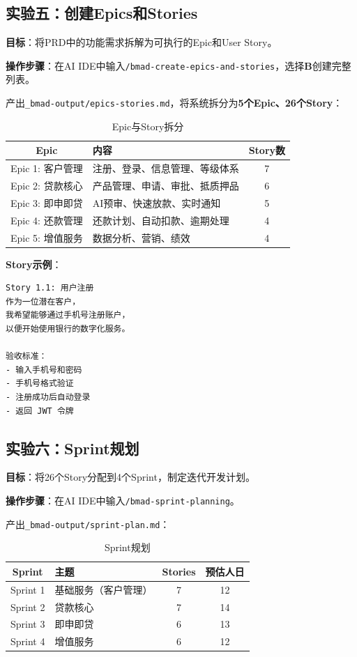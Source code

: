 \subsection{实验五：创建Epics和Stories}

\textbf{目标}：将PRD中的功能需求拆解为可执行的Epic和User Story。

\textbf{操作步骤}：在AI IDE中输入\texttt{/bmad-create-epics-and-stories}，选择\textbf{B}创建完整列表。

产出\texttt{\_bmad-output/epics-stories.md}，将系统拆分为\textbf{5个Epic、26个Story}：

\begin{table}[H]
\centering
\begin{tabular}{clc}
\toprule
\textbf{Epic} & \textbf{内容} & \textbf{Story数} \\
\midrule
Epic 1: 客户管理 & 注册、登录、信息管理、等级体系 & 7 \\
Epic 2: 贷款核心 & 产品管理、申请、审批、抵质押品 & 6 \\
Epic 3: 即申即贷 & AI预审、快速放款、实时通知 & 5 \\
Epic 4: 还款管理 & 还款计划、自动扣款、逾期处理 & 4 \\
Epic 5: 增值服务 & 数据分析、营销、绩效 & 4 \\
\bottomrule
\end{tabular}
\caption{Epic与Story拆分}
\end{table}

\textbf{Story示例}：

\begin{lstlisting}
Story 1.1: 用户注册
作为一位潜在客户，
我希望能够通过手机号注册账户，
以便开始使用银行的数字化服务。

验收标准：
- 输入手机号和密码
- 手机号格式验证
- 注册成功后自动登录
- 返回 JWT 令牌
\end{lstlisting}

\subsection{实验六：Sprint规划}

\textbf{目标}：将26个Story分配到4个Sprint，制定迭代开发计划。

\textbf{操作步骤}：在AI IDE中输入\texttt{/bmad-sprint-planning}。

产出\texttt{\_bmad-output/sprint-plan.md}：

\begin{table}[H]
\centering
\begin{tabular}{clcc}
\toprule
\textbf{Sprint} & \textbf{主题} & \textbf{Stories} & \textbf{预估人日} \\
\midrule
Sprint 1 & 基础服务（客户管理） & 7 & 12 \\
Sprint 2 & 贷款核心 & 7 & 14 \\
Sprint 3 & 即申即贷 & 6 & 13 \\
Sprint 4 & 增值服务 & 6 & 12 \\
\bottomrule
\end{tabular}
\caption{Sprint规划}
\end{table}


